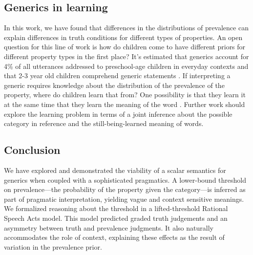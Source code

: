 \documentclass[10pt,letterpaper]{article}
\begin{document}



\subsection{Generics in learning}

In this work, we have found that differences in the distributions of prevalence can explain differences in truth conditions for different types of properties. An open question for this line of work is how do children come to have different priors for different property types in the first place? It's estimated that generics account for 4\% of all utterances addressed to preschool-age children in everyday contexts \cite{Gelman2008} and that 2-3 year old children comprehend generic statements \cite{Cimpian2011, Gelman2003}. If interpreting a generic requires knowledge about the distribution of the prevalence of the property, where do children learn that from? One possibility is that they learn it at the same time that they learn the meaning of the word \cite{Frank2009}. Further work should explore the learning problem in terms of a joint inference about the possible category in reference and the still-being-learned meaning of words. 
 
\subsection{Conclusion} 


We have explored and demonstrated the viability of a scalar semantics for generics when coupled with a sophisticated pragmatics. 
A lower-bound threshold on prevalence---the probability of the property given the category---is inferred as part of pragmatic interpretation, yielding vague and context sensitive meanings. 
%
%
We formalized reasoning about the threshold in a lifted-threshold Rational Speech Acts model. This model predicted graded truth judgements and an asymmetry between truth and prevalence judgments. It also naturally accommodates the role of context, explaining these effects as the result of variation in the prevalence prior. 
\end{document}
